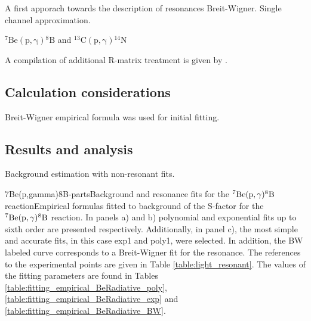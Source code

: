 \documentclass[openany]{book}
\begin{document}
A first apporach towards the description of resonances Breit-Wigner. Single channel approximation.

$\mathrm{{}^{7}{Be}(p, \gamma){}^{8}{B} } $ and $\mathrm{{}^{13}{C}(p, \gamma){}^{14}{N}} $

A compilation of additional R-matrix treatment is given by \cite{descouvemont_adahchour_angulo_coc_vangioni-flam_2004}.

\subsection{Calculation considerations} \label{sub:considerationsResonant}

Breit-Wigner empirical formula was used for initial fitting. 

\subsection{Results and analysis} \label{sub:resultsAnalysisResonant}

Background estimation with non-resonant fits.

{7Be(p,gamma)8B-parts}{Background and resonance fits for the $\mathrm{{}^{7}Be(p, \gamma){}^{8}B}$ reaction}{Empirical formulas fitted to background of the S-factor for the $\mathrm{{}^{7}Be(p, \gamma){}^{8}B}$ reaction. In panels a) and b) polynomial and exponential fits up to sixth order are presented respectively. Additionally, in panel c), the most simple and accurate fits, in this case exp1 and poly1, were selected. In addition, the BW labeled curve corresponds to a Breit-Wigner fit for the resonance.  The references to the experimental points are given in Table \ref{table:light_resonant}. The values of the fitting parameters are found in Tables \ref{table:fitting_empirical_BeRadiative_poly}, \ref{table:fitting_empirical_BeRadiative_exp} and  \ref{table:fitting_empirical_BeRadiative_BW}.}


\end{document}
